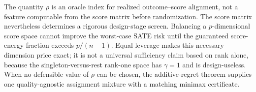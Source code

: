 The quantity \(\rho\) is an oracle index for realized outcome--score alignment, not a feature computable from the score matrix before randomization. The score matrix nevertheless determines a rigorous design-stage screen. Balancing a \(p\)-dimensional score space cannot improve the worst-case SATE risk until the guaranteed score-energy fraction exceeds \(p/(n-1)\). Equal leverage makes this necessary dimension price exact; it is not a universal sufficiency claim based on rank alone, because the singleton-versus-rest rank-one space has \(\gamma=1\) and is design-useless. When no defensible value of \(\rho\) can be chosen, the additive-regret theorem supplies one quality-agnostic assignment mixture with a matching minimax certificate.